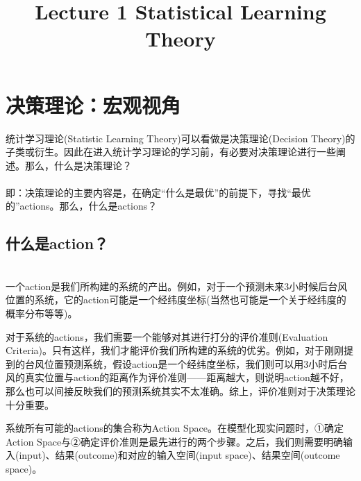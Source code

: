 \documentclass[a4paper]{article}
\title{Lecture 1 \quad Statistical Learning Theory}
\author{\kai{Alex\quad 2019年7月21日}}
\date{}
\begin{document}
	\maketitle
	
	\section{决策理论：宏观视角}

	统计学习理论(Statistic Learning Theory)可以看做是决策理论(Decision Theory)的子类或衍生。因此在进入统计学习理论的学习前，有必要对决策理论进行一些阐述。那么，什么是决策理论？\\
	
	\noindent{}\\
	
	即：决策理论的主要内容是，在确定“什么是最优”的前提下，寻找“最优的”actions。那么，什么是actions？
	
	\subsection{什么是action？}

	\noindent{}\\
	
	一个action是我们所构建的系统的产出。例如，对于一个预测未来3小时候后台风位置的系统，它的action可能是一个经纬度坐标(当然也可能是一个关于经纬度的概率分布等等)。
	
	对于系统的actions，我们需要一个能够对其进行打分的评价准则(Evaluation Criteria)。只有这样，我们才能评价我们所构建的系统的优劣。例如，对于刚刚提到的台风位置预测系统，假设action是一个经纬度坐标，我们则可以用3小时后台风的真实位置与action的距离作为评价准则——距离越大，则说明action越不好，那么也可以间接反映我们的预测系统其实不太准确。综上，评价准则对于决策理论十分重要。
	
	系统所有可能的actions的集合称为Action Space。在模型化现实问题时，①确定Action Space与②确定评价准则是最先进行的两个步骤。之后，我们则需要明确输入(input)、结果(outcome)和对应的输入空间(input space)、结果空间(outcome space)。
\end{document}
